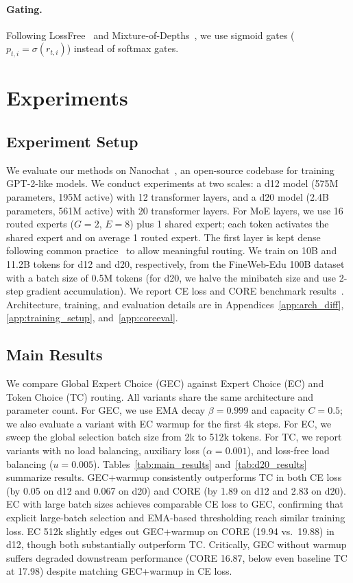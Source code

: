 \documentclass{article}
\theoremstyle{plain}
\theoremstyle{definition}
\theoremstyle{remark}
\begin{document}
\paragraph{Gating.} Following LossFree~\cite{wang2024auxiliarylossfreeloadbalancingstrategy} and Mixture-of-Depths~\cite{raposo2024mixture}, we use sigmoid gates ($p_{t,i} = \sigma(r_{t,i})$) instead of softmax gates.

\section{Experiments}
\label{sec:experiments}

\subsection{Experiment Setup}
We evaluate our methods on Nanochat~\citep{karpathy2025nanochat}, an open-source codebase for training GPT-2-like models. 
We conduct experiments at two scales: a d12 model (575M parameters, 195M active) with 12 transformer layers, and a d20 model (2.4B parameters, 561M active) with 20 transformer layers.
For MoE layers, we use 16 routed experts ($G{=}2$, $E{=}8$) plus 1 shared expert; each token activates the shared expert and on average 1 routed expert.
The first layer is kept dense following common practice~\citep{deepseekv3, wang2024auxiliarylossfreeloadbalancingstrategy} to allow meaningful routing. We train on 10B and 11.2B tokens for d12 and d20, respectively, from the FineWeb-Edu 100B dataset~\citep{penedo2024the} with a batch size of 0.5M tokens (for d20, we halve the minibatch size and use 2-step gradient accumulation). We report CE loss and CORE benchmark results~\citep{li2024dclm}. Architecture, training, and evaluation details are in Appendices~\ref{app:arch_diff}, \ref{app:training_setup}, and~\ref{app:coreeval}.


\subsection{Main Results}
We compare Global Expert Choice (GEC) against Expert Choice (EC) and Token Choice (TC) routing. All variants share the same architecture and parameter count. For GEC, we use EMA decay $\beta = 0.999$ and capacity $C = 0.5$; we also evaluate a variant with EC warmup for the first 4k steps. For EC, we sweep the global selection batch size from 2k to 512k tokens. For TC, we report variants with no load balancing, auxiliary loss ($\alpha{=}0.001$), and loss-free load balancing ($u{=}0.005$). Tables~\ref{tab:main_results} and~\ref{tab:d20_results} summarize results.
GEC+warmup consistently outperforms TC in both CE loss (by 0.05 on d12 and 0.067 on d20) and CORE (by 1.89 on d12 and 2.83 on d20). 
EC with large batch sizes achieves comparable CE loss to GEC, confirming that explicit large-batch selection and EMA-based thresholding reach similar training loss. EC 512k slightly edges out GEC+warmup on CORE (19.94 vs.\ 19.88) in d12, though both substantially outperform TC. Critically, GEC without warmup suffers degraded downstream performance (CORE 16.87, below even baseline TC at 17.98) despite matching GEC+warmup in CE loss. 
\end{document}
